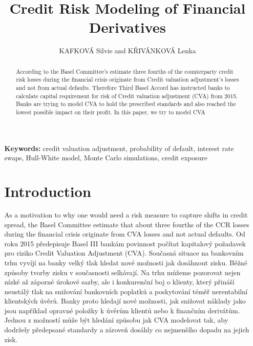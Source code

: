 \documentclass{amsart}
\theoremstyle{definition}\newtheorem{definition}[theorem]{Definition}
\theoremstyle{remark}\newtheorem{remark}[theorem]{Remark}
\begin{document}
\title{Credit Risk Modeling of Financial Derivatives}
\author{KAFKOVÁ Silvie and KŘIVÁNKOVÁ Lenka}

\begin{abstract}
According to the Basel Committee's estimate three fourths of the counterparty credit risk losses during the financial crisis originate from Credit valuation adjustment's losses and not from actual defaults. Therefore Third Basel Accord has instructed banks to calculate capital requirement for risk of Credit valuation adjustment (CVA) from 2015. Banks are trying to model CVA to hold the prescribed standards and also reached the lowest possible impact on their profit. In this paper, we try to model CVA 


\end{abstract}
\maketitle

\noindent\textbf{Keywords:} credit valuation adjustment, probability of default, interest rate swaps, Hull-White model, Monte Carlo simulations, credit exposure

\bigskip

\section{Introduction}
As a motivation to why one would need a risk measure to capture shifts in credit spread, the Basel Committee estimate that about three fourths of the CCR losses during the financial crisis originate from CVA losses and not actual defaults.
\hfill
\newline
\newline
Od roku 2015 předepisuje Basel III bankám povinnost počítat kapitalový požadavek pro riziko Credit Valuation Adjustment (CVA).
Současná situace na bankovním trhu vyvíjí na banky velký tlak hledat nové možnosti jak dosáhnout zisku.
Běžné způsoby tvorby zisku v současnosti selhávají.
Na trhu můžeme pozorovat nejen nízké až záporné úrokové sazby, ale i konkurenční boj o klienty, který přináší neustálý tlak na snižování bankovních poplatků a poskytování téměř nerentabilní klientských úvěrů.
Banky proto hledají nové možnosti, jak snižovat náklady jako jsou například opravné položky k úvěrům klientů nebo k finančním derivátům.
Jednou z možností může být hledání způsobu jak CVA modelovat tak, aby dodržely předepsané standardy a zároveň dosáhly co nejmenšího dopadu na jejich zisk. 
\end{document}

